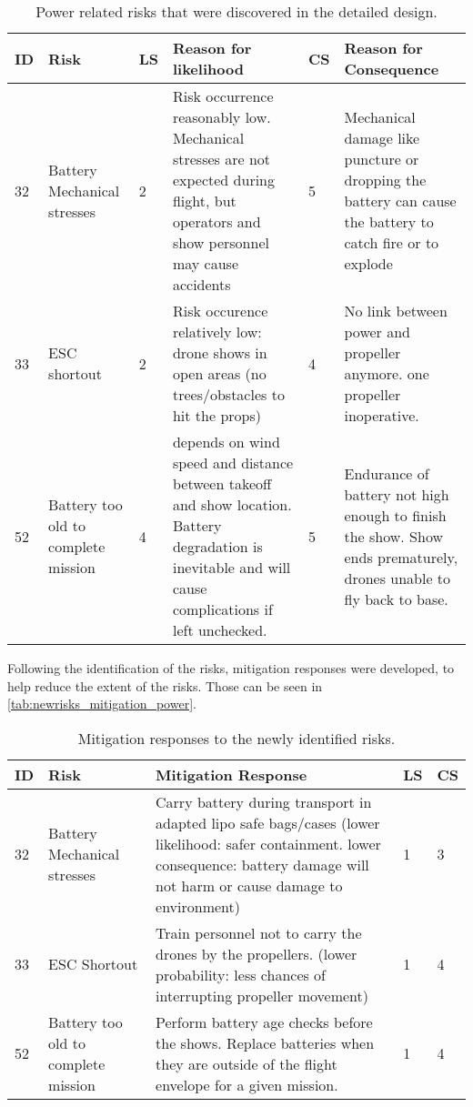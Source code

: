 \begin{table}[H]
\centering
\caption{Power related risks that were discovered in the detailed design.}
\label{tab:newriskspower}
\begin{scriptsize}
\begin{tabular}{|p{0.4cm}|p{3cm}|p{0.4cm}|p{4.5cm}|p{0.4cm}|p{4.5cm}|}
\hline
\textbf{ID} & \textbf{Risk} & \textbf{LS} & \textbf{Reason for likelihood} & \textbf{CS} & \textbf{Reason for Consequence} \\ 
\hline
32 & Battery Mechanical stresses & 2 & Risk occurrence reasonably low. Mechanical stresses are not expected during flight, but operators and show personnel may cause accidents & 5 & Mechanical damage like puncture or dropping the battery can cause the battery to catch fire or to explode \\ \hline
33 & ESC shortout & 2 & Risk occurence relatively low: drone shows in open areas (no trees/obstacles to hit the props) & 4 & No link between power and propeller anymore. one propeller inoperative. \\ \hline
52 & Battery too old to complete mission & 4 & depends on wind speed and distance between takeoff and show location. Battery degradation is inevitable and will cause complications if left unchecked. & 5 & Endurance of battery not high enough to finish the show. Show ends prematurely, drones unable to fly back to base. \\ \hline
\end{tabular}
\end{scriptsize}
\end{table}

Following the identification of the risks, mitigation responses were developed, to help reduce the extent of the risks. Those can be seen in \autoref{tab:newrisks_mitigation_power}.

\begin{table}[H]
\centering
\caption{Mitigation responses to the newly identified risks.}
\label{tab:newrisks_mitigation_power}
\begin{scriptsize}
\begin{tabular}{|p{0.4cm}|p{3cm}|p{9.2cm}|p{0.4cm}|p{0.4cm}|} 
\hline
\textbf{ID} & \textbf{Risk} & \textbf{Mitigation Response} & \textbf{LS} & \textbf{CS} \\ \hline
32 & Battery Mechanical stresses & Carry battery during transport in adapted lipo safe bags/cases (lower likelihood: safer containment. lower consequence: battery damage will not harm or cause damage to environment) & 1 & 3 \\ \hline
33 & ESC Shortout & Train personnel not to carry the drones by the propellers. (lower probability: less chances of interrupting propeller movement) & 1 & 4 \\ \hline
52 & Battery too old to complete mission & Perform battery age checks before the shows. Replace batteries when they are outside of the flight envelope for a given mission. & 1 & 4 \\ \hline
\end{tabular}
\end{scriptsize}
\end{table}





